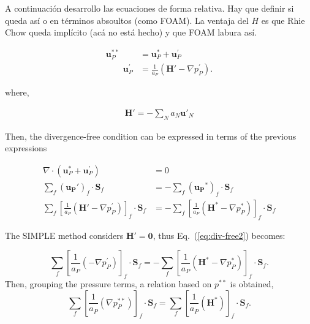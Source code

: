 \documentclass[final,3p,times,10pt,onecolumn]{myElsarticle}
\numberwithin{equation}{section}
\newcommand{\CIP}[1]{{\color{blue} #1}}
\begin{document}
\CIP{A continuación desarrollo las ecuaciones de forma relativa. Hay que definir si queda así o en términos absoultos (como FOAM). La ventaja del $H$ es que Rhie Chow queda implícito (acá no está hecho) y que FOAM labura así.}

\begin{align}
\label{eq:uprimeDef}
\boldsymbol{u}_P^{**} &= \boldsymbol{u}_P^{*} + \boldsymbol{u}_P^{'} \\
\qquad \boldsymbol{u}_P^{'} &= \frac{1}{a_P}\left(\boldsymbol{H}'- \nabla p_P^{'}\right).
\end{align}

\noindent where,

\begin{align}
\label{eq:HPrima}
   \boldsymbol{H}' = - \sum_N a_N \boldsymbol{u}'_N 
\end{align}

Then, the divergence-free condition can be expressed in terms of the previous expressions

\begin{align} \label{eq:div-free1}
\nabla \cdot \left(\boldsymbol{u}_P^{*} + \boldsymbol{u}_P^{'}\right) &= 0 \\
\sum_f \left(\boldsymbol{u_P}'\right)_{f} \cdot \boldsymbol{S}_f &= -\sum_f \left(\boldsymbol{u_P}^{*}\right)_{f} \cdot \boldsymbol{S}_f \label{eq:div-free2} \\
\sum_f \left[\frac{1}{a_P}\left(\boldsymbol{H}' - \nabla p_P^{'}\right)\right]_f\cdot \boldsymbol{S}_f &= -\sum_f \left[\frac{1}{a_P}\left(\boldsymbol{H}^* - \nabla p_P^{*}\right)\right]_f \cdot \boldsymbol{S}_f \label{eq:div-free3}
\end{align}



The SIMPLE method considers $\boldsymbol{H}'=\boldsymbol{0}$, thus Eq.~(\ref{eq:div-free2}) becomes:

\begin{equation}
\sum_f 
\left[
\frac{1}{a_P}
\left(
-
\nabla p_P^{'}
\right)
\right]_f\cdot \boldsymbol{S}_f 
=
-\sum_f \left[\frac{1}{a_P}\left(\boldsymbol{H}^* - \nabla p_P^{*}\right)\right]_f \cdot
\boldsymbol{S}_f.
\label{eq:div-free4}    
\end{equation}
Then, grouping the pressure terms, a relation based on $p^{**}$ is obtained,
\begin{equation}
\sum_f 
\left[
\frac{1}{a_P}
\left(
\nabla p_P^{**}
\right)
\right]_f\cdot \boldsymbol{S}_f 
=
\sum_f 
\left[
\frac{1}{a_P}
\left(
\boldsymbol{H}^*
\right)
\right]_f
\cdot
\boldsymbol{S}_f.
\label{eq:div-free5}  
\end{equation}
\end{document}
